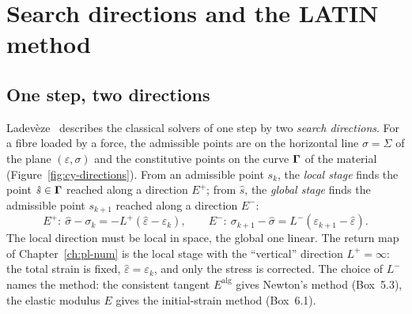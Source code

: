 \section{Search directions and the LATIN method}\label{sec:cy-latin}
%
\subsection{One step, two directions}\label{ssec:cy-dir}
Ladev\`eze~\cite[Sec.~3.3]{LadevezeNCSM} describes the classical solvers of
one step by two \emph{search directions}. For a fibre loaded by a force, the
admissible points are on the horizontal line $\sigma=\Sigma$ of the plane
$(\varepsilon,\sigma)$ and the constitutive points on the curve $\boldsymbol{\Gamma}$ of the
material (Figure~\ref{fig:cy-directions}). From an admissible point $s_k$,
the \emph{local stage} finds the point $\hat s\in\boldsymbol{\Gamma}$ reached along a
direction $E^+$; from $\hat s$, the \emph{global stage} finds the admissible
point $s_{k+1}$ reached along a direction $E^-$:
\begin{equation}\label{eq:cy-directions}
  E^+:\ \hat\sigma-\sigma_k=-L^+(\hat\varepsilon-\varepsilon_k),\qquad
  E^-:\ \sigma_{k+1}-\hat\sigma=L^-(\varepsilon_{k+1}-\hat\varepsilon).
\end{equation}
The local direction must be local in space, the global one linear. The return
map of Chapter~\ref{ch:pl-num} is the local stage with the ``vertical''
direction $L^+=\infty$: the total strain is fixed, $\hat\varepsilon=\varepsilon_k$,
and only the stress is corrected. The choice of $L^-$ names the method: the
consistent tangent $E^{\mathrm{alg}}$ gives Newton's method (Box~5.3), the
elastic modulus $E$ gives the initial-strain method (Box~6.1).

